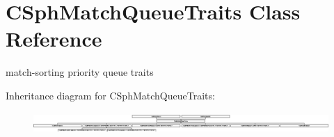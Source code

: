 \hypertarget{classCSphMatchQueueTraits}{\section{C\-Sph\-Match\-Queue\-Traits Class Reference}
\label{classCSphMatchQueueTraits}
}


match-\/sorting priority queue traits  


Inheritance diagram for C\-Sph\-Match\-Queue\-Traits\-:\begin{figure}[H]
\begin{center}
\leavevmode
\includegraphics[height=0.801144cm]{classCSphMatchQueueTraits}
\end{center}
\end{figure}
